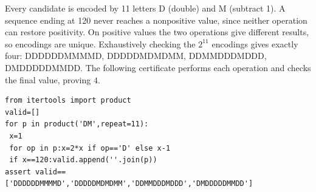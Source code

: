 Every candidate is encoded by 11 letters D (double) and M (subtract 1). A sequence ending at 120 never reaches a nonpositive value, since neither operation can restore positivity. On positive values the two operations give different results, so encodings are unique. Exhaustively checking the $2^{11}$ encodings gives exactly four: DDDDDDMMMMD, DDDDDMDMDMM, DDMMDDDMDDD, DMDDDDDMMDD. The following certificate performs each operation and checks the final value, proving $\boxed4$.
\begin{verbatim}
from itertools import product
valid=[]
for p in product('DM',repeat=11):
 x=1
 for op in p:x=2*x if op=='D' else x-1
 if x==120:valid.append(''.join(p))
assert valid==['DDDDDDMMMMD','DDDDDMDMDMM','DDMMDDDMDDD','DMDDDDDMMDD']
\end{verbatim}
